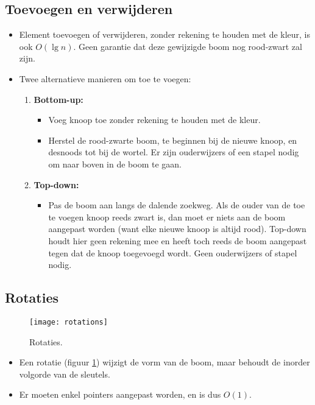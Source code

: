 \subsection{Toevoegen en verwijderen}
\begin{itemize}
    \item Element toevoegen of verwijderen, zonder rekening te houden met de kleur, is ook $O(\lg n)$.
    \alert Geen garantie dat deze gewijzigde boom nog rood-zwart zal zijn.
    \item Twee alternatieve manieren om toe te voegen:
    \begin{enumerate}
        \item \textbf{Bottom-up:} 
        \begin{itemize}
            \item Voeg knoop toe zonder rekening te houden met de kleur.
            \item Herstel de rood-zwarte boom, te beginnen bij de nieuwe knoop, en desnoods tot bij de wortel.
            \alert Er zijn ouderwijzers of een stapel nodig om naar boven in de boom te gaan.
        \end{itemize}
        \item \textbf{Top-down:} 
        \begin{itemize}
            \item Pas de boom aan langs de dalende zoekweg.
            \alert Als de ouder van de toe te voegen knoop reeds zwart is, dan moet er niets aan de boom aangepast worden (want elke nieuwe knoop is altijd rood). Top-down houdt hier geen rekening mee en heeft toch reeds de boom aangepast tegen dat de knoop toegevoegd wordt.
            \good Geen ouderwijzers of stapel nodig.
        \end{itemize}
    \end{enumerate}
\end{itemize}

\subsection{Rotaties}
\begin{figure}[ht]
    \centering
    \texttt{[image: rotations]}
    \caption{Rotaties.}
    \label{fig:rotations}
\end{figure}
\begin{itemize}
    \item Een rotatie (figuur \ref{fig:rotations}) wijzigt de vorm van de boom, maar behoudt de inorder volgorde van de sleutels.
    \item Er moeten enkel pointers aangepast worden, en is dus $O(1)$.
\end{itemize}

